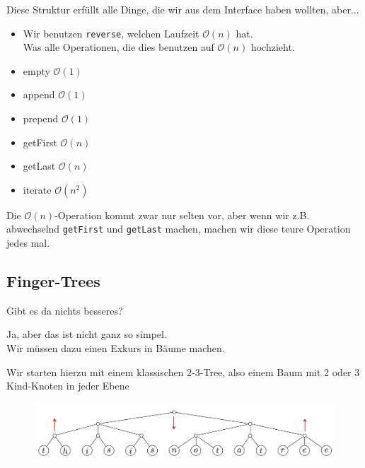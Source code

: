 \documentclass{beamer}
\begin{document}
\begin{frame}
Diese Struktur erfüllt alle Dinge, die wir aus dem Interface haben wollten, aber...
\pause
\begin{itemize}
 \item Wir benutzen \texttt{reverse}, welchen Laufzeit $\mathcal{O}(n)$ hat.\\
 \pause
       Was alle Operationen, die dies benutzen auf $\mathcal{O}(n)$ hochzieht.\\
\end{itemize}
\pause
\begin{itemize}
 \item empty $\mathcal{O}(1)$
 \item append $\mathcal{O}(1)$
 \item prepend $\mathcal{O}(1)$
 \item getFirst $\mathcal{O}(n)$
 \item getLast $\mathcal{O}(n)$
 \item iterate $\mathcal{O}(n^2)$
\end{itemize}
\pause
Die $\mathcal{O}(n)$-Operation kommt zwar nur selten vor, aber wenn wir z.B. abwechselnd \texttt{getFirst} und \texttt{getLast} machen, machen wir diese teure Operation jedes mal.
\end{frame}

\subsection{Finger-Trees}

\begin{frame}
Gibt es da nichts besseres?\pause\\\par\smallskip
Ja, aber das ist nicht ganz so simpel.\\\pause
Wir müssen dazu einen Exkurs in Bäume machen.\\\par\bigskip
Wir starten hierzu mit einem klassischen 2-3-Tree, also einem Baum mit 2 oder 3 Kind-Knoten in jeder Ebene
\end{frame}

\begin{frame}
\begin{figure}
\includegraphics[width=\textwidth]{finger-tree-1.png}
\end{figure}
\end{frame}
\end{document}
